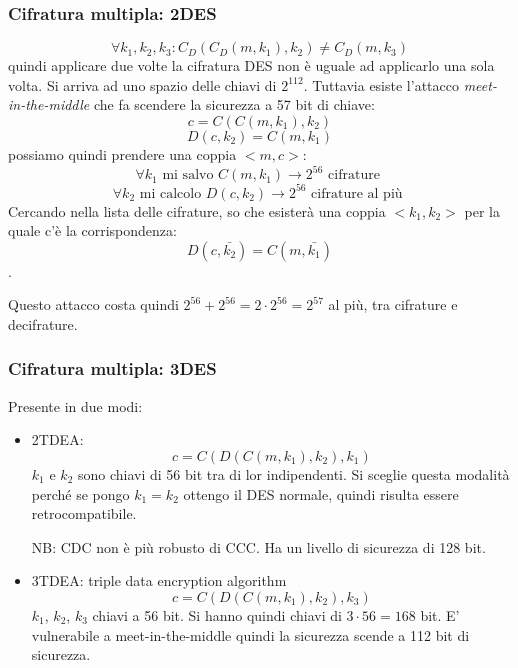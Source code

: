 \subsubsection{Cifratura multipla: 2DES}
$$ \forall k_1, k_2, k_3: C_D(C_D(m, k_1), k_2) \neq C_D(m, k_3) $$
quindi applicare due volte la cifratura DES non è uguale ad applicarlo una sola volta.
Si arriva ad uno spazio delle chiavi di $2^{112}$.
Tuttavia esiste l'attacco \emph{meet-in-the-middle} che fa scendere la sicurezza a 57 bit di chiave:
$$ c = C(C(m,k_1), k_2) $$
$$ D(c,k_2) = C(m,k_1) $$
possiamo quindi prendere una coppia $<m, c>$:
$$ \forall k_1 \text{ mi salvo } C(m, k_1) \xrightarrow{} 2^{56} \text{ cifrature }$$
$$ \forall k_2 \text{ mi calcolo } D(c, k_2) \xrightarrow{} 2^{56} \text{ cifrature al più }$$
Cercando nella lista delle cifrature, so che esisterà una coppia $<k_1, k_2>$ per la quale c'è la corrispondenza:
$$ D(c, \bar{k_2}) = C(m, \bar{k_1}) $$.

Questo attacco costa quindi $2^{56} + 2^{56} = 2 \cdot 2^{56} = 2^{57}$ al più, tra cifrature e decifrature.

\subsubsection{Cifratura multipla: 3DES}
Presente in due modi:
\begin{itemize}
    \item 2TDEA:
        $$ c = C(D(C(m, k_1), k_2), k_1) $$
        $k_1$ e $k_2$ sono chiavi di 56 bit tra di lor indipendenti. Si sceglie questa modalità perché se pongo $k_1 = k_2$ ottengo il DES normale, quindi risulta essere retrocompatibile.
        
        NB: CDC non è più robusto di CCC. Ha un livello di sicurezza di 128 bit.
    \item 3TDEA: triple data encryption algorithm
        $$ c = C(D(C(m, k_1), k_2), k_3) $$
        $k_1$, $k_2$, $k_3$ chiavi a 56 bit. Si hanno quindi chiavi di $3 \cdot 56 = 168$ bit. E' vulnerabile a meet-in-the-middle quindi la sicurezza scende a 112 bit di sicurezza.
\end{itemize}